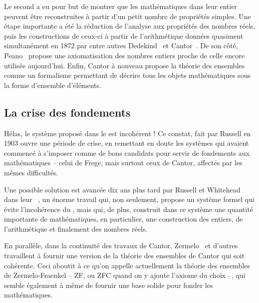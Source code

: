 Le second a eu pour but de montrer que les mathématiques dans leur entier peuvent
être reconstruites à partir d’un petit nombre de propriétés simples. Une étape
importante a été la réduction de l’analyse aux propriétés
des nombres réels, puis les constructions de ceux-ci à partir
de l’arithmétique données quasiment simultanément en 1872 par entre autres
Dedekind~ et Cantor~.
De son côté, Peano~ propose
une axiomatisation des nombres entiers proche de celle encore utilisée aujourd’hui.
Enfin, Cantor à nouveau propose la théorie des ensembles~
comme un formalisme permettant de décrire tous
les objets mathématiques sous la forme d’ensemble d’éléments.

\subsection{La crise des fondements}
Hélas, le système proposé dans le  est incohérent%
 !
Ce constat, fait par Russell en 1903%
%
ouvre une période de crise, en remettant en doute les systèmes qui avaient commencé à
s’imposer comme de bons candidats pour servir de fondements aux mathématiques –
celui de Frege, mais surtout ceux de Cantor, affectés par les mêmes difficultés.

Une possible solution est avancée dix ans plus tard
par Russell et Whitehead dans leur ~,
un énorme travail qui, non seulement, propose un système
formel qui évite l’incohérence du
, mais qui, de plus, construit
dans ce système une quantité importante de mathématiques,
en particulier, une construction des entiers, de l’arithmétique et
finalement des nombres réels.

En parallèle, dans la continuité des travaux de Cantor,
Zermelo~ et
d’autres travaillent à fournir une version de la théorie des ensembles de Cantor
qui soit cohérente. Ceci aboutit à ce qu’on appelle actuellement la
théorie des ensembles de Zermelo-Fraenkel – ZF, ou ZFC quand on y ajoute l’axiome
du choix %
–, qui semble également à même de fournir une base solide pour fonder les
mathématiques.

